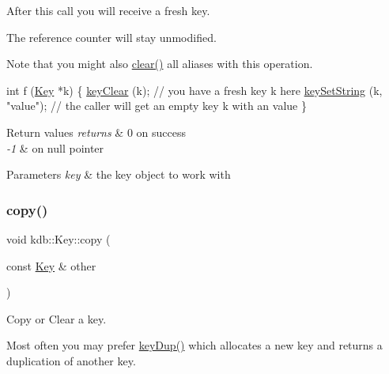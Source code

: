 After this call you will receive a fresh key.

The reference counter will stay unmodified.

\begin{DoxyNote}{Note}
that you might also \hyperlink{classkdb_1_1Key_a33a112681b0b2e94e6d369c0f89e361b}{clear()} all aliases with this operation.
\end{DoxyNote}

\begin{DoxyCode}
\textcolor{keywordtype}{int} f (\hyperlink{classkdb_1_1Key_a5679f5cae63caddd64a60388b9cc77fa}{Key} *k)
\{
        \hyperlink{group__key_gab2242311a36bbc0520e0d36895107ec1}{keyClear} (k);
        \textcolor{comment}{// you have a fresh key k here}
        \hyperlink{group__keyvalue_ga622bde1eb0e0c4994728331326340ef2}{keySetString} (k, \textcolor{stringliteral}{"value"});
        \textcolor{comment}{// the caller will get an empty key k with an value}
\}
\end{DoxyCode}



\begin{DoxyRetVals}{Return values}
{\em returns} & 0 on success \\
\hline
{\em -\/1} & on null pointer\\
\hline
\end{DoxyRetVals}

\begin{DoxyParams}{Parameters}
{\em key} & the key object to work with \\
\hline
\end{DoxyParams}
\mbox{\label{classkdb_1_1Key_ab5bc93e22f4cf40b9d2b1fc32cc260be}} 
\subsubsection{\texorpdfstring{copy()}{copy()}}
{\footnotesize\ttfamily void kdb\+::\+Key\+::copy (\begin{DoxyParamCaption}\item[{const \hyperlink{classkdb_1_1Key}{Key} \&}]{other }\end{DoxyParamCaption})\hspace{0.3cm}{\ttfamily [inline]}}



Copy or Clear a key. 

Most often you may prefer \hyperlink{group__key_gae6ec6a60cc4b8c1463fa08623d056ce3}{key\+Dup()} which allocates a new key and returns a duplication of another key.

